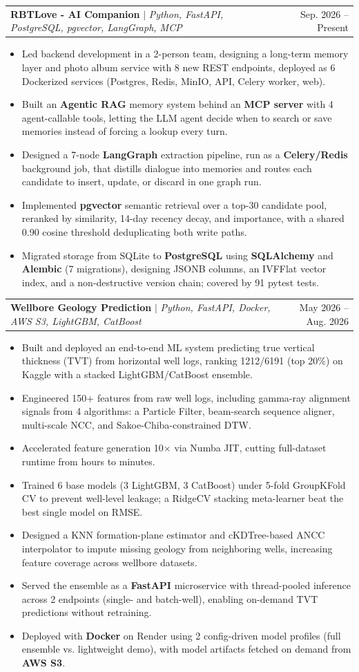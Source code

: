 \documentclass[letterpaper,11pt]{article}
\makeatletter
\newcommand{\resumeItem}[1]{\item\small{{#1 \vspace{-2pt}}}}
\newcommand{\resumeProjectHeading}[2]{
    \item
    \begin{tabular*}{0.97\textwidth}{l@{\extracolsep{\fill}}r}
      \small#1 & #2 \\
    \end{tabular*}\vspace{-7pt}
}
\newcommand{\resumeItemListStart}{\begin{itemize}}
\newcommand{\resumeItemListEnd}{\end{itemize}\vspace{-5pt}}
\makeatother
\begin{document}
      \resumeProjectHeading
          {\textbf{RBTLove - AI Companion} $|$ \emph{Python, FastAPI, PostgreSQL, pgvector, LangGraph, MCP}}{Sep. 2026 -- Present}
          \resumeItemListStart
            \resumeItem{Led backend development in a 2-person team, designing a long-term memory layer and photo album service with 8 new REST endpoints, deployed as 6 Dockerized services (Postgres, Redis, MinIO, API, Celery worker, web).}
            \resumeItem{Built an \textbf{Agentic RAG} memory system behind an \textbf{MCP server} with 4 agent-callable tools, letting the LLM agent decide when to search or save memories instead of forcing a lookup every turn.}
            \resumeItem{Designed a 7-node \textbf{LangGraph} extraction pipeline, run as a \textbf{Celery/Redis} background job, that distills dialogue into memories and routes each candidate to insert, update, or discard in one graph run.}
            \resumeItem{Implemented \textbf{pgvector} semantic retrieval over a top-30 candidate pool, reranked by similarity, 14-day recency decay, and importance, with a shared 0.90 cosine threshold deduplicating both write paths.}
            \resumeItem{Migrated storage from SQLite to \textbf{PostgreSQL} using \textbf{SQLAlchemy} and \textbf{Alembic} (7 migrations), designing JSONB columns, an IVFFlat vector index, and a non-destructive version chain; covered by 91 pytest tests.}
          \resumeItemListEnd

      \resumeProjectHeading
          {\textbf{Wellbore Geology Prediction} $|$ \emph{Python, FastAPI, Docker, AWS S3, LightGBM, CatBoost}}{May 2026 -- Aug. 2026}
          \resumeItemListStart
            \resumeItem{Built and deployed an end-to-end ML system predicting true vertical thickness (TVT) from horizontal well logs, ranking 1212/6191 (top 20\%) on Kaggle with a stacked LightGBM/CatBoost ensemble.}
            \resumeItem{Engineered 150+ features from raw well logs, including gamma-ray alignment signals from 4 algorithms: a Particle Filter, beam-search sequence aligner, multi-scale NCC, and Sakoe-Chiba-constrained DTW.}
            \resumeItem{Accelerated feature generation 10$\times$ via Numba JIT, cutting full-dataset runtime from hours to minutes.}
            \resumeItem{Trained 6 base models (3 LightGBM, 3 CatBoost) under 5-fold GroupKFold CV to prevent well-level leakage; a RidgeCV stacking meta-learner beat the best single model on RMSE.}
            \resumeItem{Designed a KNN formation-plane estimator and cKDTree-based ANCC interpolator to impute missing geology from neighboring wells, increasing feature coverage across wellbore datasets.}
            \resumeItem{Served the ensemble as a \textbf{FastAPI} microservice with thread-pooled inference across 2 endpoints (single- and batch-well), enabling on-demand TVT predictions without retraining.}
            \resumeItem{Deployed with \textbf{Docker} on Render using 2 config-driven model profiles (full ensemble vs. lightweight demo), with model artifacts fetched on demand from \textbf{AWS S3}.}
          \resumeItemListEnd
\end{document}

